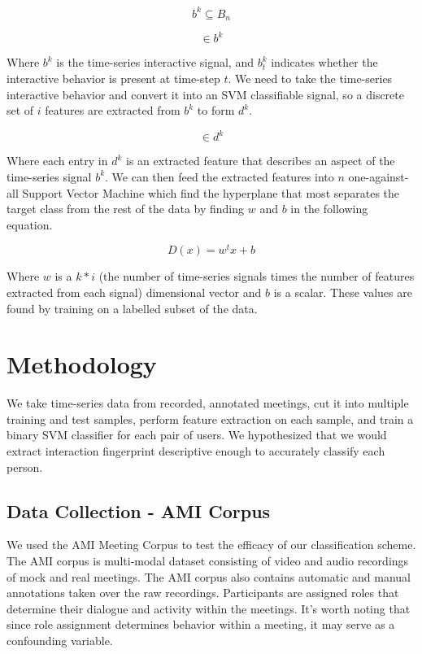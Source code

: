 \documentclass[conference]{IEEEtran}
\begin{document}
\begin{equation}
    b^k \subseteq B_n
\end{equation}

\begin{equation}
    [b^k_{t=0} ... b^k_{t=n}] \in b^k
\end{equation}

Where $b^k$ is the time-series interactive signal, and $b^k_t$ indicates whether the interactive behavior is present at time-step $t$. We need to take the time-series interactive behavior and convert it into an SVM classifiable signal, so a discrete set of $i$ features are extracted from $b^k$ to form $d^k$.

\begin{equation}
    [d^k_0 ... d^k_i] \in d^k
\end{equation}

Where each entry in $d^k$ is an extracted feature that describes an aspect of the time-series signal $b^k$. We can then feed the extracted features into $n$ one-against-all Support Vector Machine which find the hyperplane that most separates the target class from the rest of the data by finding $w$ and $b$ in the following equation. \cite{abe_analysis_2003}

\begin{equation}
    D(x) = w^tx + b
\end{equation}

Where $w$ is a $k*i$ (the number of time-series signals times the number of features extracted from each signal) dimensional vector and $b$ is a scalar. These values are found by training on a labelled subset of the data. 


\section{Methodology}
We take time-series data from recorded, annotated meetings, cut it into multiple training and test samples, perform feature extraction on each sample, and train a binary SVM classifier for each pair of users. We hypothesized that we would extract interaction fingerprint descriptive enough to accurately classify each person. 


\subsection{Data Collection - AMI Corpus}
We used the AMI Meeting Corpus \cite{ami_corpus} to test the efficacy of our classification scheme. The AMI corpus is multi-modal dataset consisting of video and audio recordings of mock and real meetings. The AMI corpus also contains automatic and manual annotations taken over the raw recordings. Participants are assigned roles that determine their dialogue and activity within the meetings. It's worth noting that since role assignment determines behavior within a meeting, it may serve as a confounding variable. 
\end{document}
